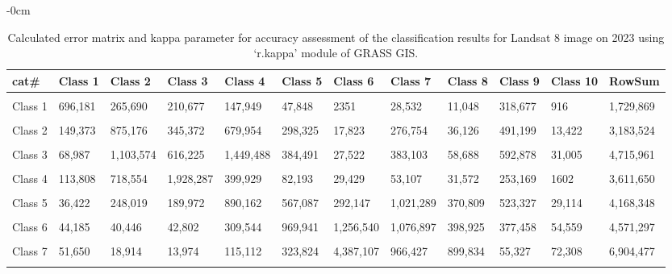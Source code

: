 \documentclass[analytics,article,accept,pdftex,moreauthors]{Definitions/mdpi}
\begin{document}
\begin{table}[H] 
    \caption{Calculated error matrix and kappa parameter for accuracy assessment of the classification results for Landsat 8 image on 2023 using `r.kappa' module of GRASS GIS.}%
    \begin{adjustwidth}{-\extralength}{0cm}
 	\begin{tabularx}{\fulllength}{lllllllllllL}
    \toprule
        \textbf{cat\#} & \textbf{Class 1} & \textbf{Class 2} & \textbf{Class 3} & \textbf{Class 4} & \textbf{Class 5} & \textbf{Class 6} & \textbf{Class 7} & \textbf{Class 8} & \textbf{Class 9} & \textbf{Class 10} & \textbf{RowSum} \\ \hline
      &&&&&&&&&&&\\[-2ex]
        Class 1 & 696,181 & 265,690 & 210,677 & 147,949 & 47,848 & 2351 & 28,532 & 11,048 & 318,677 & 916 & 1,729,869 \\ \hline
      &&&&&&&&&&&\\[-2ex]
        Class 2 & 149,373 & 875,176 & 345,372 & 679,954 & 298,325 & 17,823 & 276,754 & 36,126 & 491,199 & 13,422 & 3,183,524 \\ \hline
      &&&&&&&&&&&\\[-2ex]
        Class 3 & 68,987 & 1,103,574 & 616,225 & 1,449,488 & 384,491 & 27,522 & 383,103 & 58,688 & 592,878 & 31,005 & 4,715,961 \\ \hline
      &&&&&&&&&&&\\[-2ex]
        Class 4 & 113,808 & 718,554 & 1,928,287 & 399,929 & 82,193 & 29,429 & 53,107 & 31,572 & 253,169 & 1602 & 3,611,650 \\ \hline
      &&&&&&&&&&&\\[-2ex]
        Class 5 & 36,422 & 248,019 & 189,972 & 890,162 & 567,087 & 292,147 & 1,021,289 & 370,809 & 523,327 & 29,114 & 4,168,348 \\ \hline
      &&&&&&&&&&&\\[-2ex]
        Class 6 & 44,185 & 40,446 & 42,802 & 309,544 & 969,941 & 1,256,540 & 1,076,897 & 398,925 & 377,458 & 54,559 & 4,571,297 \\ \hline
      &&&&&&&&&&&\\[-2ex]
        Class 7 & 51,650 & 18,914 & 13,974 & 115,112 & 323,824 & 4,387,107 & 966,427 & 899,834 & 55,327 & 72,308 & 6,904,477 \\ \hline
      &&&&&&&&&&&\\[-2ex]

\end{tabularx}
\end{adjustwidth}
\end{table}
\end{document}
